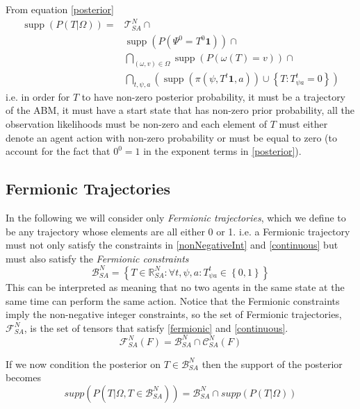 \documentclass{article}
\DeclareMathOperator\supp{supp}
\begin{document}
From equation \eqref{posterior}
\begin{equation}
\begin{aligned}
\supp (P( T |\Omega)) = & \mathcal{T}^N_{SA} \cap \\ 
&\supp(P(\Psi^0 = T^0\mathbf{1})) \cap \\
&\bigcap_{(\omega,v) \in \Omega}  \supp\left(P\left(\omega(T)=v\right)\right) \cap \\
&\bigcap_{t, \psi, a} \left( \supp\left(\pi(\psi,T^t\mathbf{1},a)\right) \cup \left\{T:T^t_{\psi a} = 0\right\} \right)
\end{aligned}
\label{support}
\end{equation}
i.e. in order for $T$ to have non-zero posterior probability, it must be a trajectory of the ABM, it must have a start state that has non-zero prior probability, all the observation likelihoods must be non-zero and each element of $T$ must either denote an agent action with non-zero probability or must be equal to zero (to account for the fact that $0^0=1$ in the exponent terms in \eqref{posterior}).

\subsection{Fermionic Trajectories}

In the following we will consider only \textit{Fermionic trajectories}, which we define to be any trajectory whose elements are all either 0 or 1. i.e. a Fermionic trajectory must not only satisfy the constraints in \eqref{nonNegativeInt} and \eqref{continuous} but must also satisfy the \textit{Fermionic constraints}
\begin{equation}
\mathcal{B}^N_{SA} = \left\{T\in\mathbb{R}^N_{SA} : \forall t,\psi,a: T^t_{\psi a} \in \left\{ 0,1 \right\}\right\}
\label{fermionic}
\end{equation}
This can be interpreted as meaning that no two agents in the same state at the same time can perform the same action. Notice that the Fermionic constraints imply the non-negative integer constraints, so the set of Fermionic trajectories, $\mathcal{F}^N_{SA}$, is the set of tensors that satisfy \eqref{fermionic} and \eqref{continuous}.
\begin{equation}
\mathcal{F}^N_{SA}(F) = \mathcal{B}^N_{SA} \cap \mathcal{C}^N_{SA}(F)
\end{equation}

If we now condition the posterior on $T \in \mathcal{B}^N_{SA}$ then the support of the posterior becomes
\begin{equation}
supp(P(T|\Omega, T\in\mathcal{B}^N_{SA})) = \mathcal{B}^N_{SA} \cap supp(P(T|\Omega))
\label{fermionicSupport1}
\end{equation}
\end{document}
